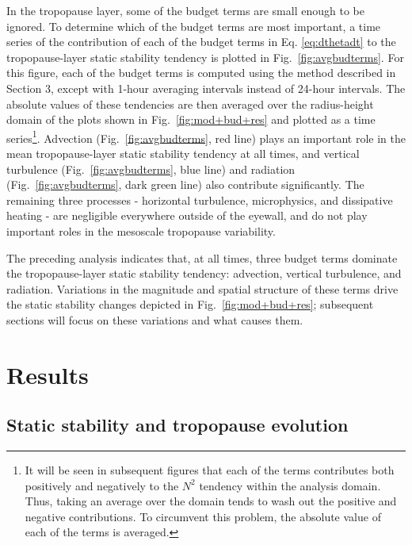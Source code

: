 \documentclass{ametsoc}
\begin{document}
In the tropopause layer, some of the budget terms are small enough to be ignored.
To determine which of the budget terms are most important, a time series of the contribution of each of the budget terms in Eq. \ref{eq:dthetadt} to the tropopause-layer static stability tendency is plotted in Fig.~\ref{fig:avgbudterms}.
For this figure, each of the budget terms is computed using the method described in Section 3, except with 1-hour averaging intervals instead of 24-hour intervals.
The absolute values of these tendencies are then averaged over the radius-height domain of the plots shown in Fig.~\ref{fig:mod+bud+res} and plotted as a time series\footnote{It will be seen in subsequent figures that each of the terms contributes both positively and negatively to the $N^2$ tendency within the analysis domain. 
Thus, taking an average over the domain tends to wash out the positive and negative contributions.
To circumvent this problem, the absolute value of each of the terms is averaged.}. 
Advection (Fig.~\ref{fig:avgbudterms}, red line) plays an important role in the mean tropopause-layer static stability tendency at all times, and vertical turbulence (Fig.~\ref{fig:avgbudterms}, blue line) and radiation (Fig.~\ref{fig:avgbudterms}, dark green line) also contribute significantly.
The remaining three processes - horizontal turbulence, microphysics, and dissipative heating -  are negligible everywhere outside of the eyewall, and do not play important roles in the mesoscale tropopause variability.

The preceding analysis indicates that, at all times, three budget terms dominate the tropopause-layer static stability tendency: advection, vertical turbulence, and radiation.
Variations in the magnitude and spatial structure of these terms drive the static stability changes depicted in Fig.~\ref{fig:mod+bud+res}; subsequent sections will focus on these variations and what causes them.

 \section{Results}

 \subsection{Static stability and tropopause evolution}
\end{document}
